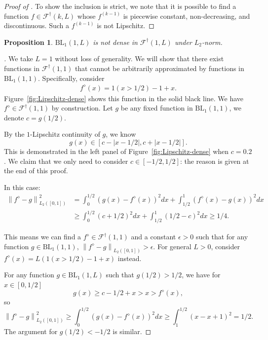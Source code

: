 \documentclass[12pt]{article}
\newtheorem{proposition}[theorem]{Proposition}
\begin{document}
\begin{appendices}
\begin{proof}[Proof of ]
    To show the inclusion is strict, we note that it is possible to find a function $f\in \mathcal{F}^\dagger(k, L)$ whose $f^{(k-1)}$ is piecewise constant, non-decreasing, and discontinuous. Such a $f^{(k-1)}$ is not Lipschitz.
\end{proof}

\begin{proposition}\label{prop:dense-subset}
$\mathrm{BL}_1(1,L)$ is not dense in  $\mathcal{F}^\dagger(1,L)$ under $L_2$-norm. 
\end{proposition}
\begin{proof}[]
We take $L=1$ without loss of generality. We will show that there exist functions in $\mathcal{F}^\dagger(1,1)$ that cannot be arbitrarily approximated by functions in $\mathrm{BL}_1(1, 1)$. Specifically, consider
\begin{align*}
    f^\diamond(x) =  1( x > 1/2) -1 + x.
\end{align*}
Figure~\ref{fig:Lipschitz-dense} shows this function in the solid black line. We have $f^\diamond \in \mathcal{F}^\dagger(1, 1)$ by construction. Let $g$ be any fixed function in $\mathrm{BL}_1(1, 1)$, we denote $c = g(1/2)$. 

By the $1$-Lipschitz continuity of $g$, we know
\begin{equation*}
    g(x) \in [c - |x - 1/2|, c+|x-1/2|].
\end{equation*}
This is demonstrated in the left panel of Figure~\ref{fig:Lipschitz-dense} when $c=0.2$. We claim that we only need to consider $c\in [-1/2, 1/2]$: the reason is given at the end of this proof.

In this case:
\begin{equation*}
\begin{aligned}
   \left\|f^{\diamond}-g\right\|_{L_2([0,1])}^2 & = \int_0^{1/2} (g(x) - f^\diamond(x))^2 dx + \int_{1/2}^1 (f^\diamond(x) - g(x))^2 dx \\
   & \geq \int_0^{1/2} (c + 1/2)^2 dx + \int_{1/2}^1 (1/2 - c)^2 dx \geq 1/4.
\end{aligned}
\end{equation*}

This means we can find a $f^{\diamond} \in \mathcal{F}^\dagger(1,1)$ and a constant $\epsilon > 0$ such that for any function $g\in \mathrm{BL}_1(1,1)$, $\left\|f^{\diamond}-g\right\|_{L_2([0,1])} > \epsilon$. For general $L >0$, consider $f^{\diamond}(x)=L(1(x>1 / 2)-1+x)$ instead.

For any function $g \in\mathrm{BL}_1(1, L)$ such that $g(1/2) > 1/2$, we have for $x\in[0,1/2]$
\begin{equation*}
    g(x) \geq c -1/2 + x > x > f^\diamond(x),
\end{equation*}
so
\begin{equation*}
\left\|f^{\diamond}-g\right\|_{L_2([0,1])}^2 \geq \int_0^{1 / 2}\left(g(x)-f^{\diamond}(x)\right)^2 d x \geq \int_1^{1/2}(x - x +1)^2 = 1/2.
\end{equation*}
The argument for $g(1/2) < -1/2$ is similar.
\end{proof}


\end{appendices}
\end{document}
